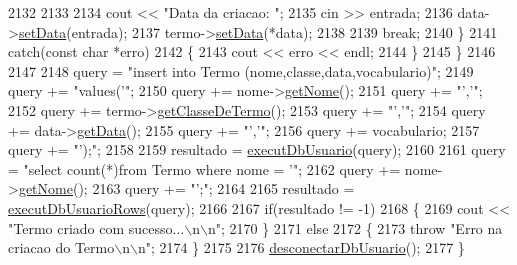 \begin{DoxyCode}
2132 
2133 
2134     cout << \textcolor{stringliteral}{"Data da criacao: "};
2135     cin >> entrada;
2136     data->\mbox{\hyperlink{class_data_a5245638838a033c98a8b760836dddb7d}{setData}}(entrada);
2137     termo->\mbox{\hyperlink{class_termo_abf829a90ed067a580bb9d4c90db0f160}{setData}}(*data);
2138 
2139     \textcolor{keywordflow}{break};
2140   \}
2141   \textcolor{keywordflow}{catch}(\textcolor{keyword}{const} \textcolor{keywordtype}{char} *erro)
2142   \{
2143     cout << erro << endl;
2144   \}
2145 \}
2146 
2147 
2148   query = \textcolor{stringliteral}{"insert into Termo (nome,classe,data,vocabulario)"};
2149   query += \textcolor{stringliteral}{"values('"};
2150   query += nome->\mbox{\hyperlink{class_nome_aad41176173eec20cbbae1576447a3697}{getNome}}();
2151   query += \textcolor{stringliteral}{"','"};
2152   query += termo->\mbox{\hyperlink{class_termo_ae7e8fb47c8e03506b98a952fa25aa97b}{getClasseDeTermo}}();
2153   query += \textcolor{stringliteral}{"','"};
2154   query += data->\mbox{\hyperlink{class_data_afc7b15a5e81334858e48709b2f45cdc3}{getData}}();
2155   query += \textcolor{stringliteral}{"','"};
2156   query += vocabulario;
2157   query += \textcolor{stringliteral}{"');"};
2158 
2159   resultado = \mbox{\hyperlink{comando_sql_8cpp_a748197580e7f9acdbf48c78de1f7924b}{executDbUsuario}}(query);
2160 
2161   query = \textcolor{stringliteral}{"select count(*)from Termo where nome = '"};
2162   query += nome->\mbox{\hyperlink{class_nome_aad41176173eec20cbbae1576447a3697}{getNome}}();
2163   query += \textcolor{stringliteral}{"';"};
2164 
2165   resultado = \mbox{\hyperlink{comando_sql_8cpp_af54952694f2fa7d76f969fb74b853cb9}{executDbUsuarioRows}}(query);
2166 
2167   \textcolor{keywordflow}{if}(resultado != -1)
2168   \{
2169     cout << \textcolor{stringliteral}{"Termo criado com sucesso...\(\backslash\)n\(\backslash\)n"};
2170   \}
2171   \textcolor{keywordflow}{else}
2172   \{
2173     \textcolor{keywordflow}{throw} \textcolor{stringliteral}{"Erro na criacao do Termo\(\backslash\)n\(\backslash\)n"};
2174   \}
2175 
2176   \mbox{\hyperlink{comando_sql_8cpp_a969be9911913568e30d4ae8963338bc3}{desconectarDbUsuario}}();
2177 \}
\end{DoxyCode}
\mbox{\label{class_servico_usuarios_administrador_aa1bda96596ffda5676af7181eaae9466}} 
